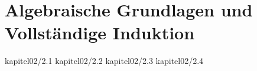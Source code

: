 \chapter{Algebraische Grundlagen und Vollständige Induktion}
  {kapitel02/2.1}
 {kapitel02/2.2}
 {kapitel02/2.3}
 {kapitel02/2.4}




